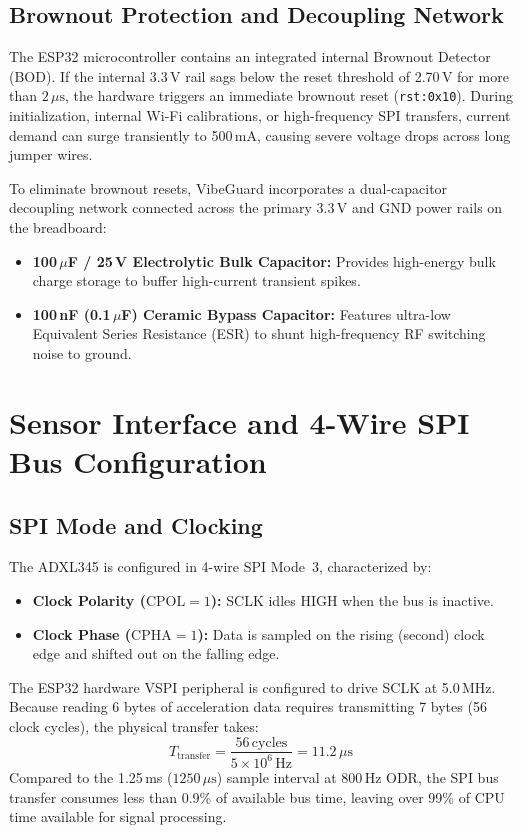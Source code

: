 \subsection{Brownout Protection and Decoupling Network}
The ESP32 microcontroller contains an integrated internal Brownout Detector (BOD). If the internal 3.3\,V rail sags below the reset threshold of 2.70\,V for more than $2\,\mu\text{s}$, the hardware triggers an immediate brownout reset (\texttt{rst:0x10}). During initialization, internal Wi-Fi calibrations, or high-frequency SPI transfers, current demand can surge transiently to 500\,mA, causing severe voltage drops across long jumper wires.

To eliminate brownout resets, VibeGuard incorporates a dual-capacitor decoupling network connected across the primary 3.3\,V and GND power rails on the breadboard:
\begin{itemize}
    \item \textbf{100\,$\mu$F / 25\,V Electrolytic Bulk Capacitor:} Provides high-energy bulk charge storage to buffer high-current transient spikes.
    \item \textbf{100\,nF (0.1\,$\mu$F) Ceramic Bypass Capacitor:} Features ultra-low Equivalent Series Resistance (ESR) to shunt high-frequency RF switching noise to ground.
\end{itemize}

\section{Sensor Interface and 4-Wire SPI Bus Configuration}
\subsection{SPI Mode and Clocking}
The ADXL345 is configured in 4-wire SPI Mode~3, characterized by:
\begin{itemize}
    \item \textbf{Clock Polarity ($\mathrm{CPOL} = 1$):} SCLK idles HIGH when the bus is inactive.
    \item \textbf{Clock Phase ($\mathrm{CPHA} = 1$):} Data is sampled on the rising (second) clock edge and shifted out on the falling edge.
\end{itemize}
The ESP32 hardware VSPI peripheral is configured to drive SCLK at 5.0\,MHz. Because reading 6 bytes of acceleration data requires transmitting 7 bytes (56 clock cycles), the physical transfer takes:
\begin{equation}
T_{\mathrm{transfer}} = \frac{56\,\text{cycles}}{5 \times 10^6\,\text{Hz}} = 11.2\,\mu\text{s}
\end{equation}
Compared to the 1.25\,ms ($1250\,\mu\text{s}$) sample interval at 800\,Hz ODR, the SPI bus transfer consumes less than 0.9\% of available bus time, leaving over 99\% of CPU time available for signal processing.

